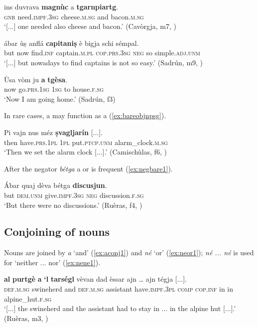 \ea
\label{ex:baremass}
\gll [...] ins duvrava \textbf{magnùc} a \textbf{tgarnpiartg}.   \\
{} \textsc{gnr} need.\textsc{impf.3sg} cheese.\textsc{m.sg} and bacon.\textsc{m.sg} \\
\glt `[...] one needed also cheese and bacon.' (Cavòrgja, m7, )
\z

\ea
\label{ex:bareindefpl}
\gll [...] ábar ùṣ anflá \textbf{capitaniṣ} è bigja schi sémpal.\\
{} but now find.\textsc{inf} captain.\textsc{m.pl} \textsc{cop.prs.3sg} \textsc{neg} so simple.\textsc{adj.unm}\\
\glt `[...] but nowadays to find captains is not so easy.' (Sadrún, m9, )
\z

\ea
\label{ex:barepp1}
\gll Ùsa vòm ju \textbf{a} \textbf{tgèsa}.\\
now go.\textsc{prs.1sg} \textsc{1sg} to house.\textsc{f.sg}\\
\glt `Now I am going home.' (Sadrún, f3)
\z

In rare cases, a  may function as a  (\ref{ex:bareobjnpsg}).

\ea
\label{ex:bareobjnpsg}
\gll Pi vajn nus méz \textbf{ṣvagljarín} [...].\\
then have.\textsc{prs.1pl} \textsc{1pl} put.\textsc{ptcp.unm} alarm\_clock.\textsc{m.sg}\\
\glt `Then we set the alarm clock [...].' (Camischùlas, f6, )
\z

After the negator \textit{bétga} a  or  is frequent (\ref{ex:negbare1}).

\ea
\label{ex:negbare1}
\gll Ábar quaj dèva bétga \textbf{discusjun}.\\
but \textsc{dem.unm} give.\textsc{impf.3sg} \textsc{neg} discussion.\textsc{f.sg}\\
\glt `But there were no discussions.' (Ruèras, f4, )
\z

\subsection{Conjoining of nouns}\label{sec:3.1.5}
Nouns are joined by \textit{a} `and' (\ref{ex:aconj1}) and \textit{né} `or' (\ref{ex:neor1}); \textit{né ... né} is used for `neither ... nor' (\ref{ex:nene1}).

\ea
\label{ex:aconj1}
\gll  [...] \textbf{al}  \textbf{purtgè} \textbf{a} \textbf{‘l} \textbf{tarségl} vèvan dad èssar ajn … ajn tégja [...].\\
 {} \textsc{def.m.sg} swineherd and \textsc{def.m.sg} assistant have.\textsc{impf.3pl} \textsc{comp} \textsc{cop.inf} in {} in alpine\_hut.\textsc{f.sg} \\
\glt `[...] the swineherd and the assistant had to stay in ... in the alpine hut [...].' (Ruèras, m3, )
\z


